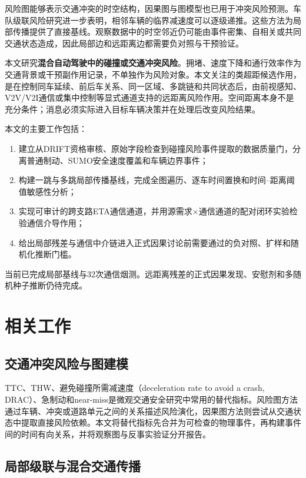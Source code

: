 \documentclass[journal]{IEEEtran}
\begin{document}
风险图能够表示交通冲突的时空结构\cite{wang2024conflict}，因果图与图模型也已用于冲突风险预测\cite{lyu2025causal}。车队级联风险研究进一步表明，相邻车辆的临界减速度可以逐级递推\cite{luo2026crm}。这些方法为局部传播提供了直接基线。观察数据中的时空邻近仍可能由事件密集、自相关或共同交通状态造成，因此局部边和远距离边都需要负对照与干预验证。

本文研究\textbf{混合自动驾驶中的碰撞或交通冲突风险}。拥堵、速度下降和通行效率作为交通背景或干预副作用记录，不单独作为风险对象。本文关注的类超距候选作用，是在控制同车延续、前后车关系、同一区域、多跳链和共同状态后，由前视感知、V2V/V2I通信或集中控制等显式通道支持的远距离风险作用。空间距离本身不是充分条件；消息必须实际进入目标车辆决策并在处理后改变风险结果。

本文的主要工作包括：
\begin{enumerate}
    \item 建立从DRIFT资格审核、原始字段检查到碰撞风险事件提取的数据质量门，分离普通制动、SUMO安全速度覆盖和车辆边界事件；
    \item 构建一跳与多跳局部传播基线，完成全图遍历、逐车时间置换和时间--距离阈值敏感性分析；
    \item 实现可审计的跨支路ETA通信通道，并用源需求$\times$通信通道的配对闭环实验检验通信介导作用；
    \item 给出局部残差与通信中介链进入正式因果讨论前需要通过的负对照、扩样和随机化推断门槛。
\end{enumerate}

当前已完成局部基线与32次通信烟测。远距离残差的正式因果发现、安慰剂和多随机种子推断仍待完成。

\section{相关工作}\label{sec:related_work}

\subsection{交通冲突风险与图建模}

TTC、THW、避免碰撞所需减速度（deceleration rate to avoid a crash, DRAC）、急制动和near-miss是微观交通安全研究中常用的替代指标。风险图方法通过车辆、冲突或道路单元之间的关系描述风险演化\cite{wang2024conflict}，因果图方法则尝试从交通状态中提取直接风险依赖\cite{lyu2025causal}。本文将替代指标先合并为可检查的物理事件，再构建事件间的时间有向关系，并将观察图与反事实验证分开报告。

\subsection{局部级联与混合交通传播}
\end{document}
